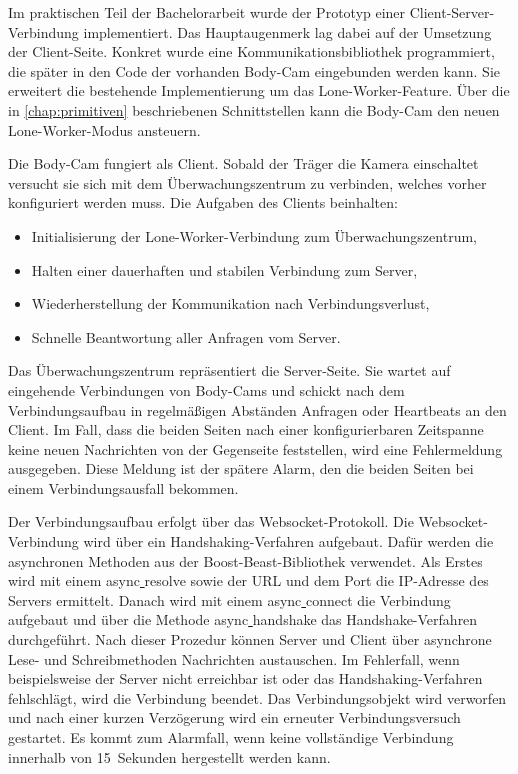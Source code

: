 \documentclass[thesis.tex]{subfiles}
\begin{document}
Im praktischen Teil der Bachelorarbeit wurde der Prototyp einer Client-Server-Verbindung implementiert.
Das Hauptaugenmerk lag dabei auf der Umsetzung der Client-Seite.
Konkret wurde eine Kommunikationsbibliothek programmiert, die später in den Code der vorhanden Body-Cam eingebunden werden kann.
Sie erweitert die bestehende Implementierung um das Lone-Worker-Feature.
Über die in \autoref{chap:primitiven} beschriebenen Schnittstellen kann die Body-Cam den neuen Lone-Worker-Modus ansteuern.

Die Body-Cam fungiert als Client.
Sobald der Träger die Kamera einschaltet versucht sie sich mit dem Überwachungszentrum zu verbinden, welches vorher konfiguriert werden muss.
Die Aufgaben des Clients beinhalten:
\begin{itemize}
    \item Initialisierung der Lone-Worker-Verbindung zum Überwachungszentrum,
    \item Halten einer dauerhaften und stabilen Verbindung zum Server,
    \item Wiederherstellung der Kommunikation nach Verbindungsverlust,
    \item Schnelle Beantwortung aller Anfragen vom Server.
\end{itemize}

Das Überwachungszentrum repräsentiert die Server-Seite.
Sie wartet auf eingehende Verbindungen von Body-Cams und schickt nach dem Verbindungsaufbau in regelmäßigen Abständen Anfragen oder Heartbeats an den Client.
Im Fall, dass die beiden Seiten nach einer konfigurierbaren Zeitspanne keine neuen Nachrichten von der Gegenseite feststellen, wird eine Fehlermeldung ausgegeben.
Diese Meldung ist der spätere Alarm, den die beiden Seiten bei einem Verbindungsausfall bekommen.

Der Verbindungsaufbau erfolgt über das Websocket-Protokoll.
Die Websocket-Verbindung wird über ein Handshaking-Verfahren aufgebaut.
Dafür werden die asynchronen Methoden aus der Boost-Beast-Bibliothek verwendet.
Als Erstes wird mit einem \glqq async\underline{ }resolve\grqq{} sowie der URL und dem Port die IP-Adresse des Servers ermittelt.
Danach wird mit einem \glqq async\underline{ }connect\grqq{} die Verbindung aufgebaut und über die Methode \glqq async\underline{ }handshake\grqq{} das Handshake-Verfahren durchgeführt.
Nach dieser Prozedur können Server und Client über asynchrone Lese- und Schreibmethoden Nachrichten austauschen.
Im Fehlerfall, wenn beispielsweise der Server nicht erreichbar ist oder das Handshaking-Verfahren fehlschlägt, wird die Verbindung beendet.
Das Verbindungsobjekt wird verworfen und nach einer kurzen Verzögerung wird ein erneuter Verbindungsversuch gestartet.
Es kommt zum Alarmfall, wenn keine vollständige Verbindung innerhalb von 15~Sekunden hergestellt werden kann.
\end{document}
